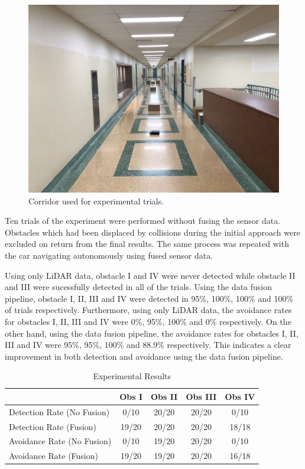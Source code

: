 \documentclass[conference]{IEEEtran}
\begin{document}
\begin{figure}[h!]
    \centering
    \includegraphics[scale=0.3]{IMG_0506.jpg}
    \caption{Corridor used for experimental trials.}
    \label{Figure 11}
\end{figure}

Ten trials of the experiment were performed without fusing the sensor data. Obstacles which had been displaced by collisions during the initial approach were excluded on return from the final results. The same process was repeated with the car navigating autonomously using fused sensor data.

Using only LiDAR data, obstacle I and IV were never detected while obstacle II and III were sucessfully detected in all of the trials. Using the data fusion pipeline, obstacle I, II, III and IV were detected in 95\%, 100\%, 100\% and 100\%  of trials respectively. Furthermore, using only LiDAR data, the avoidance rates for obstacles I, II, III and IV were 0\%, 95\%, 100\% and 0\% respectively. On the other hand, using the data fusion pipeline, the avoidance rates for obstacles I, II, III and IV were 95\%, 95\%, 100\% and 88.9\% respectively. This indicates a clear improvement in both detection and avoidance using the data fusion pipeline. 

\begin{table}[ht]
\centering
\caption{Experimental Results}
\begin{tabular}{||p{2cm}|c|c|c|c||}
\hline
 & Obs I & Obs II & Obs III & Obs IV \\
\hline \hline
Detection Rate (No Fusion) & 0/10 & 20/20 & 20/20 & 0/10 \\
\hline
Detection Rate (Fusion) & 19/20 & 20/20 & 20/20 & 18/18\\
\hline
Avoidance Rate (No Fusion) & 0/10 & 19/20 & 20/20 & 0/10 \\
\hline
Avoidance Rate (Fusion) & 19/20 & 19/20 & 20/20 & 16/18 \\ 
\hline
\end{tabular}
\label{table:1}
\end{table}
\end{document}
